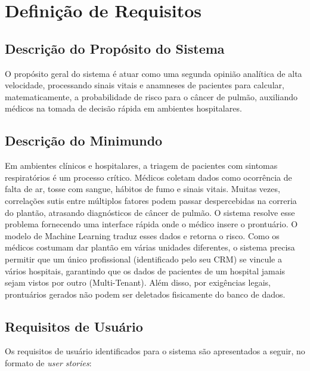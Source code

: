 \documentclass{article}
\begin{document}
\section{Definição de Requisitos}
\subsection{Descrição do Propósito do Sistema}
O propósito geral do sistema é atuar como uma segunda opinião analítica de alta velocidade, processando sinais vitais e anamneses de pacientes para calcular, matematicamente, a probabilidade de risco para o câncer de pulmão, auxiliando médicos na tomada de decisão rápida em ambientes hospitalares.

\subsection{Descrição do Minimundo}
Em ambientes clínicos e hospitalares, a triagem de pacientes com sintomas respiratórios é um processo crítico. Médicos coletam dados como ocorrência de falta de ar, tosse com sangue, hábitos de fumo e sinais vitais. Muitas vezes, correlações sutis entre múltiplos fatores podem passar despercebidas na correria do plantão, atrasando diagnósticos de câncer de pulmão. O sistema resolve esse problema fornecendo uma interface rápida onde o médico insere o prontuário. O modelo de Machine Learning traduz esses dados e retorna o risco. Como os médicos costumam dar plantão em várias unidades diferentes, o sistema precisa permitir que um único profissional (identificado pelo seu CRM) se vincule a vários hospitais, garantindo que os dados de pacientes de um hospital jamais sejam vistos por outro (Multi-Tenant). Além disso, por exigências legais, prontuários gerados não podem ser deletados fisicamente do banco de dados.

\subsection{Requisitos de Usuário}
Os requisitos de usuário identificados para o sistema são apresentados a seguir, no formato de \textit{user stories}:
\end{document}
